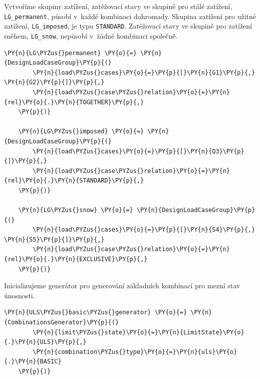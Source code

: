     Vytvoříme skupiny zatížení, zatěžovací stavy ve skupině pro stálé zatížení, \texttt{LG\_permanent}, působí v~každé kombinaci dohromady. Skupina zatížení pro užitné zatížení, \texttt{LG\_imposed}, je typu \texttt{STANDARD}. Zatěžovací stavy ve skupině pro zatížení sněhem, \texttt{LG\_snow}, nepůsobí v~žádné kombinaci společně.
        \begin{tcolorbox}[breakable, size=fbox, boxrule=1pt, pad at break*=1mm,colback=cellbackground, colframe=cellborder]
    \begin{Verbatim}[commandchars=\\\{\}]
    \PY{n}{LG\PYZus{}permanent} \PY{o}{=} \PY{n}{DesignLoadCaseGroup}\PY{p}{(}
        \PY{n}{load\PYZus{}cases}\PY{o}{=}\PY{p}{[}\PY{n}{G1}\PY{p}{,} \PY{n}{G2}\PY{p}{]}\PY{p}{,}
        \PY{n}{load\PYZus{}case\PYZus{}relation}\PY{o}{=}\PY{n}{rel}\PY{o}{.}\PY{n}{TOGETHER}\PY{p}{,}
    \PY{p}{)}
    
    \PY{n}{LG\PYZus{}imposed} \PY{o}{=} \PY{n}{DesignLoadCaseGroup}\PY{p}{(}
        \PY{n}{load\PYZus{}cases}\PY{o}{=}\PY{p}{[}\PY{n}{Q3}\PY{p}{]}\PY{p}{,}
        \PY{n}{load\PYZus{}case\PYZus{}relation}\PY{o}{=}\PY{n}{rel}\PY{o}{.}\PY{n}{STANDARD}\PY{p}{,}
    \PY{p}{)}
    
    \PY{n}{LG\PYZus{}snow} \PY{o}{=} \PY{n}{DesignLoadCaseGroup}\PY{p}{(}
        \PY{n}{load\PYZus{}cases}\PY{o}{=}\PY{p}{[}\PY{n}{S4}\PY{p}{,} \PY{n}{S5}\PY{p}{]}\PY{p}{,}
        \PY{n}{load\PYZus{}case\PYZus{}relation}\PY{o}{=}\PY{n}{rel}\PY{o}{.}\PY{n}{EXCLUSIVE}\PY{p}{,}
    \PY{p}{)}
    \end{Verbatim}
    \end{tcolorbox}
    
    Inicializujeme generátor pro generování základních kombinací pro mezní stav únosnosti.
        \begin{tcolorbox}[breakable, size=fbox, boxrule=1pt, pad at break*=1mm,colback=cellbackground, colframe=cellborder]
    \begin{Verbatim}[commandchars=\\\{\}]
    \PY{n}{ULS\PYZus{}basic\PYZus{}generator} \PY{o}{=} \PY{n}{CombinationsGenerator}\PY{p}{(}
        \PY{n}{limit\PYZus{}state}\PY{o}{=}\PY{n}{LimitState}\PY{o}{.}\PY{n}{ULS}\PY{p}{,}
        \PY{n}{combination\PYZus{}type}\PY{o}{=}\PY{n}{uls}\PY{o}{.}\PY{n}{BASIC}
    \PY{p}{)}
    \end{Verbatim}
    \end{tcolorbox}
    

